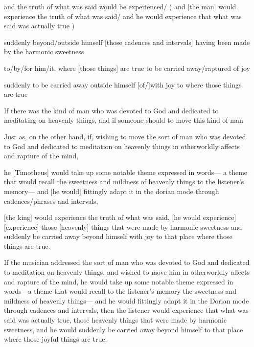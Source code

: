 and the truth of what was said would be experienced/
( and [the man] would experience the truth of what was said/
 and he would experience that what was said was actually true )

suddenly beyond/outside himself
[those cadences and intervals] having been made by the harmonic sweetness

to/by/for him/it,
where 
[those things] are true
to be carried away/raptured
of joy

suddenly to be carried away outside himself
[of/]with joy to where those things are true

If there was the kind of man who was devoted to God
and dedicated to meditating on heavenly things,
and if someone should to move this kind of man 

Just as, on the other hand, 
if, 
wishing to move the sort of man 
    who was devoted to God and dedicated to meditation on heavenly things
  in otherworldly affects and rapture of the mind,

he [Timotheus] would take up 
some notable theme expressed in words---
  a theme that would recall the sweetness and mildness of heavenly things
  to the listener's memory---
and [he would] fittingly adapt it 
  in the dorian mode through cadences/phrases and intervals,

[the king] would experience the truth of what was said,
[he would experience]
[experience] those [heavenly] things that were made by harmonic sweetness
and suddenly be carried away beyond himself with joy 
to that place where those things are true. 

If the musician addressed the sort of man who was devoted to God and dedicated to meditation on heavenly things,
and wished to move him in otherworldly affects and rapture of the mind,
he would take up some notable theme expressed in words---a theme that would recall to the listener's memory the sweetness and mildness of heavenly things---
and he would fittingly adapt it in the Dorian mode through cadences and intervals,
then the listener would experience that what was said was actually true,
those heavenly things that were made by harmonic sweetness,
and he would suddenly be carried away beyond himself to that place where those joyful things are true.


















 
